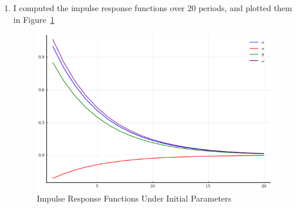 \documentclass[10pt]{article}
\begin{document}
\begin{enumerate}
	\item I computed the impulse response functions over 20 periods, and plotted them in Figure~\ref{fig:q2irf} \begin{figure}[H] \centering \includegraphics[width=12cm]{macro_hw6_code/q2_irf.png} \caption{Impulse Response Functions Under Initial Parameters} \label{fig:q2irf}\end{figure}

\end{enumerate}
\end{document}
